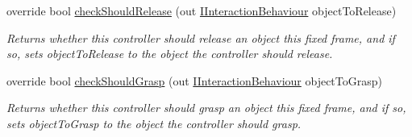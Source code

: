 \begin{DoxyCompactItemize}
override bool \mbox{\hyperlink{class_leap_1_1_unity_1_1_interaction_1_1_interaction_hand_aaf0c4bf5f6892517ac5be576104550b4}{check\+Should\+Release}} (out \mbox{\hyperlink{interface_leap_1_1_unity_1_1_interaction_1_1_i_interaction_behaviour}{I\+Interaction\+Behaviour}} object\+To\+Release)
\begin{DoxyCompactList}\small\item\em Returns whether this controller should release an object this fixed frame, and if so, sets object\+To\+Release to the object the controller should release. \end{DoxyCompactList}\item 
override bool \mbox{\hyperlink{class_leap_1_1_unity_1_1_interaction_1_1_interaction_hand_ae9cb040d9827bec38bf1c1b3560d7cbb}{check\+Should\+Grasp}} (out \mbox{\hyperlink{interface_leap_1_1_unity_1_1_interaction_1_1_i_interaction_behaviour}{I\+Interaction\+Behaviour}} object\+To\+Grasp)
\begin{DoxyCompactList}\small\item\em Returns whether this controller should grasp an object this fixed frame, and if so, sets object\+To\+Grasp to the object the controller should grasp. \end{DoxyCompactList}\end{DoxyCompactItemize}
